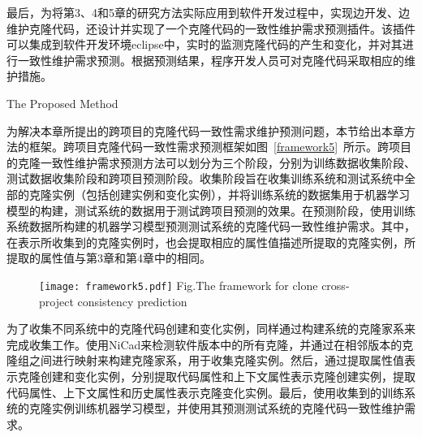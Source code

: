 最后，为将第3、4和5章的研究方法实际应用到软件开发过程中，实现边开发、边维护克隆代码，还设计并实现了一个克隆代码的一致性维护需求预测插件。该插件可以集成到软件开发环境eclipse中，实时的监测克隆代码的产生和变化，并对其进行一致性维护需求预测。根据预测结果，程序开发人员可对克隆代码采取相应的维护措施。


{The Proposed Method}

为解决本章所提出的跨项目的克隆代码一致性需求维护预测问题，本节给出本章方法的框架。跨项目克隆代码一致性需求预测框架如图~\ref{framework5}~所示。跨项目的克隆一致性维护需求预测方法可以划分为三个阶段，分别为训练数据收集阶段、测试数据收集阶段和跨项目预测阶段。收集阶段旨在收集训练系统和测试系统中全部的克隆实例（包括创建实例和变化实例），并将训练系统的数据集用于机器学习模型的构建，测试系统的数据用于测试跨项目预测的效果。在预测阶段，使用训练系统数据所构建的机器学习模型预测测试系统的克隆代码一致性维护需求。其中，在表示所收集到的克隆实例时，也会提取相应的属性值描述所提取的克隆实例，所提取的属性值与第3章和第4章中的相同。

\begin{figure}[htbp]
\centering
\texttt{[image: framework5.pdf]}
{Fig.$\!$}{The framework for clone cross-project consistency prediction}
\vspace{-1em}
\end{figure}

为了收集不同系统中的克隆代码创建和变化实例，同样通过构建系统的克隆家系来完成收集工作。使用NiCad来检测软件版本中的所有克隆，并通过在相邻版本的克隆组之间进行映射来构建克隆家系，用于收集克隆实例。然后，通过提取属性值表示克隆创建和变化实例，分别提取代码属性和上下文属性表示克隆创建实例，提取代码属性、上下文属性和历史属性表示克隆变化实例。最后，使用收集到的训练系统的克隆实例训练机器学习模型，并使用其预测测试系统的克隆代码一致性维护需求。

